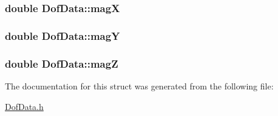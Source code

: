\hypertarget{struct_dof_data_aa246a750759f0e35fc1c6d51bf3171c9}{
\subsubsection[{mag\-X}]{\setlength{\rightskip}{0pt plus 5cm}double Dof\-Data\-::mag\-X}}\label{struct_dof_data_aa246a750759f0e35fc1c6d51bf3171c9}
\hypertarget{struct_dof_data_a68d222fd9ddebf38e7d2248d5b346bbb}{
\subsubsection[{mag\-Y}]{\setlength{\rightskip}{0pt plus 5cm}double Dof\-Data\-::mag\-Y}}\label{struct_dof_data_a68d222fd9ddebf38e7d2248d5b346bbb}
\hypertarget{struct_dof_data_ae2583a4b6e851d1f3640a94028799231}{
\subsubsection[{mag\-Z}]{\setlength{\rightskip}{0pt plus 5cm}double Dof\-Data\-::mag\-Z}}\label{struct_dof_data_ae2583a4b6e851d1f3640a94028799231}


The documentation for this struct was generated from the following file\-:\begin{DoxyCompactItemize}
\item 
\hyperlink{_dof_data_8h}{Dof\-Data.\-h}\end{DoxyCompactItemize}
